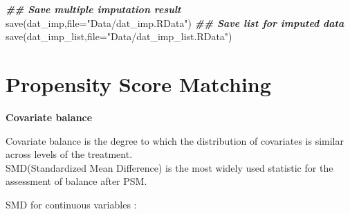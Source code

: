 \documentclass[
]{book}
\newenvironment{Shaded}{\begin{snugshade}}{\end{snugshade}}
\newcommand{\AttributeTok}[1]{\textcolor[rgb]{0.77,0.63,0.00}{#1}}
\newcommand{\ControlFlowTok}[1]{\textcolor[rgb]{0.13,0.29,0.53}{\textbf{#1}}}
\newcommand{\DecValTok}[1]{\textcolor[rgb]{0.00,0.00,0.81}{#1}}
\newcommand{\DocumentationTok}[1]{\textcolor[rgb]{0.56,0.35,0.01}{\textbf{\textit{#1}}}}
\newcommand{\FunctionTok}[1]{\textcolor[rgb]{0.00,0.00,0.00}{#1}}
\newcommand{\NormalTok}[1]{#1}
\newcommand{\OtherTok}[1]{\textcolor[rgb]{0.56,0.35,0.01}{#1}}
\newcommand{\SpecialCharTok}[1]{\textcolor[rgb]{0.00,0.00,0.00}{#1}}
\newcommand{\StringTok}[1]{\textcolor[rgb]{0.31,0.60,0.02}{#1}}
\begin{document}
\begin{Shaded}
\end{Shaded}

\begin{Shaded}
\begin{Highlighting}[]
\DocumentationTok{\#\# Save multiple imputation result}
\FunctionTok{save}\NormalTok{(dat\_imp,}\AttributeTok{file=}\StringTok{"Data/dat\_imp.RData"}\NormalTok{)}
\DocumentationTok{\#\# Save list for imputed data}
\FunctionTok{save}\NormalTok{(dat\_imp\_list,}\AttributeTok{file=}\StringTok{"Data/dat\_imp\_list.RData"}\NormalTok{)}
\end{Highlighting}
\end{Shaded}

\hypertarget{propensity-score-matching}{%
\chapter{Propensity Score Matching}\label{propensity-score-matching}}

\textbf{Covariate balance}

Covariate balance is the degree to which the distribution of covariates is similar across levels of the treatment.\\
SMD(Standardized Mean Difference) is the most widely used statistic for the assessment of balance after PSM.

SMD for continuous variables :
\end{document}
